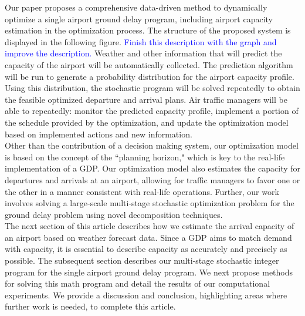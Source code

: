 \documentclass[12pt]{article}
\begin{document}
	\newline
	Our paper proposes a comprehensive data-driven method to dynamically optimize a single airport ground delay program, including airport capacity estimation in the optimization process. The structure of the proposed system is displayed in the following figure. \textcolor{blue}{Finish this description with the graph and improve the description.} Weather and other information that will predict the capacity of the airport will be automatically collected. The prediction algorithm will be run to generate a probability distribution for the airport capacity profile. Using this distribution, the stochastic program will be solved repeatedly to obtain the feasible optimized departure and arrival plans. Air traffic managers will be able to repeatedly: monitor the predicted capacity profile, implement a portion of the schedule provided by the optimization, and update the optimization model based on implemented actions and new information.\\
	\newline
	\noindent Other than the contribution of a decision making system, our optimization model is based on the concept of the ``planning horizon," which is key to the real-life implementation of a GDP.  Our optimization model also estimates the capacity for departures and arrivals at an airport, allowing for traffic managers to favor one or the other in a manner consistent with real-life operations. Further, our work involves solving a large-scale multi-stage stochastic optimization problem for the ground delay problem using novel decomposition techniques. \\
	\newline
	The next section of this article describes how we estimate the arrival capacity of an airport based on weather forecast data.  Since a GDP aims to match demand with capacity, it is essential to describe capacity as accurately and precisely as possible. The subsequent section describes our multi-stage stochastic integer program for the single airport ground delay program. We next propose methods for solving this math program and detail the results of our computational experiments.  We provide a discussion and conclusion, highlighting areas where further work is needed, to complete this article.
	
\end{document}
